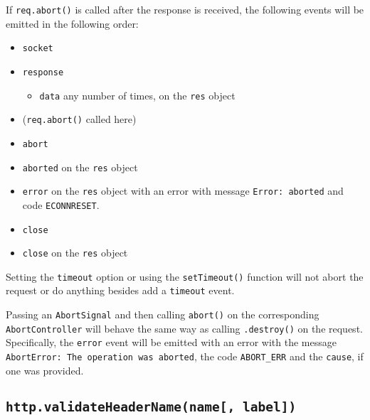 If \texttt{req.abort()} is called after the response is received, the
following events will be emitted in the following order:

\begin{itemize}
\tightlist
\item
  \texttt{\textquotesingle{}socket\textquotesingle{}}
\item
  \texttt{\textquotesingle{}response\textquotesingle{}}

  \begin{itemize}
  \tightlist
  \item
    \texttt{\textquotesingle{}data\textquotesingle{}} any number of
    times, on the \texttt{res} object
  \end{itemize}
\item
  (\texttt{req.abort()} called here)
\item
  \texttt{\textquotesingle{}abort\textquotesingle{}}
\item
  \texttt{\textquotesingle{}aborted\textquotesingle{}} on the
  \texttt{res} object
\item
  \texttt{\textquotesingle{}error\textquotesingle{}} on the \texttt{res}
  object with an error with message
  \texttt{\textquotesingle{}Error:\ aborted\textquotesingle{}} and code
  \texttt{\textquotesingle{}ECONNRESET\textquotesingle{}}.
\item
  \texttt{\textquotesingle{}close\textquotesingle{}}
\item
  \texttt{\textquotesingle{}close\textquotesingle{}} on the \texttt{res}
  object
\end{itemize}

Setting the \texttt{timeout} option or using the \texttt{setTimeout()}
function will not abort the request or do anything besides add a
\texttt{\textquotesingle{}timeout\textquotesingle{}} event.

Passing an \texttt{AbortSignal} and then calling \texttt{abort()} on the
corresponding \texttt{AbortController} will behave the same way as
calling \texttt{.destroy()} on the request. Specifically, the
\texttt{\textquotesingle{}error\textquotesingle{}} event will be emitted
with an error with the message
\texttt{\textquotesingle{}AbortError:\ The\ operation\ was\ aborted\textquotesingle{}},
the code \texttt{\textquotesingle{}ABORT\_ERR\textquotesingle{}} and the
\texttt{cause}, if one was provided.

\subsection{\texorpdfstring{\texttt{http.validateHeaderName(name{[},\ label{]})}}{http.validateHeaderName(name{[}, label{]})}}\label{http.validateheadernamename-label}

